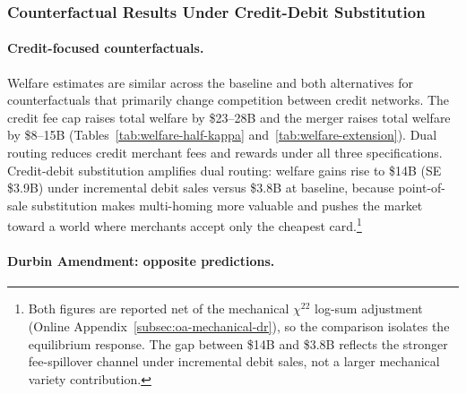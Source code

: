 \documentclass[main.tex]{subfiles}
\begin{document}
\subsubsection{Counterfactual Results Under Credit-Debit Substitution}
\label{subsubsec:oa-alternatives-summary}

\paragraph{Credit-focused counterfactuals.}

Welfare estimates are similar across the baseline and both alternatives for counterfactuals that primarily change competition between credit networks.
The credit fee cap raises total welfare by \$23--28B and the merger raises total welfare by \$8--15B (Tables~\ref{tab:welfare-half-kappa} and~\ref{tab:welfare-extension}).
Dual routing reduces credit merchant fees and rewards under all three specifications.
Credit-debit substitution amplifies dual routing: welfare gains rise to \$14B (SE \$3.9B) under incremental debit sales versus \$3.8B at baseline, because point-of-sale substitution makes multi-homing more valuable and pushes the market toward a world where merchants accept only the cheapest card.\footnote{
    Both figures are reported net of the mechanical $\chi^{22}$ log-sum adjustment (Online Appendix~\ref{subsec:oa-mechanical-dr}), so the comparison isolates the equilibrium response.
    The gap between \$14B and \$3.8B reflects the stronger fee-spillover channel under incremental debit sales, not a larger mechanical variety contribution.
}

\paragraph{Durbin Amendment: opposite predictions.}
\end{document}
